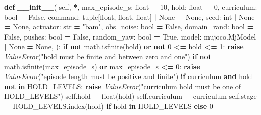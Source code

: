 \documentclass[
  chinese,
  11pt,
  letterpaper,
]{article}
\newenvironment{Shaded}{\begin{snugshade}}{\end{snugshade}}
\newcommand{\BuiltInTok}[1]{#1}
\newcommand{\ControlFlowTok}[1]{\textcolor[rgb]{0.13,0.29,0.53}{\textbf{#1}}}
\newcommand{\DecValTok}[1]{\textcolor[rgb]{0.00,0.00,0.81}{#1}}
\newcommand{\FunctionTok}[1]{\textcolor[rgb]{0.13,0.29,0.53}{\textbf{#1}}}
\newcommand{\KeywordTok}[1]{\textcolor[rgb]{0.13,0.29,0.53}{\textbf{#1}}}
\newcommand{\NormalTok}[1]{#1}
\newcommand{\OperatorTok}[1]{\textcolor[rgb]{0.81,0.36,0.00}{\textbf{#1}}}
\newcommand{\PreprocessorTok}[1]{\textcolor[rgb]{0.56,0.35,0.01}{\textit{#1}}}
\newcommand{\StringTok}[1]{\textcolor[rgb]{0.31,0.60,0.02}{#1}}
\newcommand{\VariableTok}[1]{\textcolor[rgb]{0.00,0.00,0.00}{#1}}
\renewenvironment{Shaded}{\par\smallskip}{\par\smallskip}
\begin{document}
\begin{Shaded}
\begin{Highlighting}[]
    \KeywordTok{def} \FunctionTok{\_\_init\_\_}\NormalTok{(}
        \VariableTok{self}\NormalTok{, }\OperatorTok{*}\NormalTok{, max\_episode\_s: }\BuiltInTok{float} \OperatorTok{=} \DecValTok{10}\NormalTok{, hold: }\BuiltInTok{float} \OperatorTok{=} \DecValTok{0}\NormalTok{,}
\NormalTok{        curriculum: }\BuiltInTok{bool} \OperatorTok{=} \VariableTok{False}\NormalTok{, command: }\BuiltInTok{tuple}\NormalTok{[}\BuiltInTok{float}\NormalTok{, }\BuiltInTok{float}\NormalTok{, }\BuiltInTok{float}\NormalTok{] }\OperatorTok{|} \VariableTok{None} \OperatorTok{=} \VariableTok{None}\NormalTok{,}
\NormalTok{        seed: }\BuiltInTok{int} \OperatorTok{|} \VariableTok{None} \OperatorTok{=} \VariableTok{None}\NormalTok{, actuator: }\BuiltInTok{str} \OperatorTok{=} \StringTok{"bam"}\NormalTok{, obs\_noise: }\BuiltInTok{bool} \OperatorTok{=} \VariableTok{False}\NormalTok{,}
\NormalTok{        domain\_rand: }\BuiltInTok{bool} \OperatorTok{=} \VariableTok{False}\NormalTok{, pushes: }\BuiltInTok{bool} \OperatorTok{=} \VariableTok{False}\NormalTok{, random\_yaw: }\BuiltInTok{bool} \OperatorTok{=} \VariableTok{True}\NormalTok{,}
\NormalTok{        model: mujoco.MjModel }\OperatorTok{|} \VariableTok{None} \OperatorTok{=} \VariableTok{None}\NormalTok{,}
\NormalTok{    ):}
        \ControlFlowTok{if} \KeywordTok{not}\NormalTok{ math.isfinite(hold) }\KeywordTok{or} \KeywordTok{not} \DecValTok{0} \OperatorTok{\textless{}=}\NormalTok{ hold }\OperatorTok{\textless{}=} \DecValTok{1}\NormalTok{:}
            \ControlFlowTok{raise} \PreprocessorTok{ValueError}\NormalTok{(}\StringTok{"hold must be finite and between zero and one"}\NormalTok{)}
        \ControlFlowTok{if} \KeywordTok{not}\NormalTok{ math.isfinite(max\_episode\_s) }\KeywordTok{or}\NormalTok{ max\_episode\_s }\OperatorTok{\textless{}=} \DecValTok{0}\NormalTok{:}
            \ControlFlowTok{raise} \PreprocessorTok{ValueError}\NormalTok{(}\StringTok{"episode length must be positive and finite"}\NormalTok{)}
        \ControlFlowTok{if}\NormalTok{ curriculum }\KeywordTok{and}\NormalTok{ hold }\KeywordTok{not} \KeywordTok{in}\NormalTok{ HOLD\_LEVELS:}
            \ControlFlowTok{raise} \PreprocessorTok{ValueError}\NormalTok{(}\StringTok{"curriculum hold must be one of HOLD\_LEVELS"}\NormalTok{)}
        \VariableTok{self}\NormalTok{.hold }\OperatorTok{=} \BuiltInTok{float}\NormalTok{(hold)}
        \VariableTok{self}\NormalTok{.curriculum }\OperatorTok{=}\NormalTok{ curriculum}
        \VariableTok{self}\NormalTok{.stage }\OperatorTok{=}\NormalTok{ HOLD\_LEVELS.index(hold) }\ControlFlowTok{if}\NormalTok{ hold }\KeywordTok{in}\NormalTok{ HOLD\_LEVELS }\ControlFlowTok{else} \DecValTok{0}

\end{Highlighting}
\end{Shaded}
\end{document}
